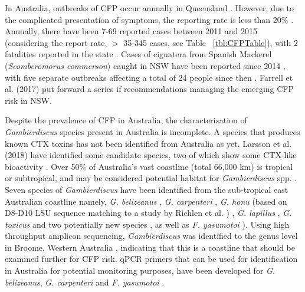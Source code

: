 \documentclass[12pt]{article}
\begin{document}
In Australia, outbreaks of CFP occur annually in Queensland \citep{qldcig}. 
However, due to the complicated presentation of symptoms, the reporting rate is less than 20\% \citep{lewis2006ciguatera}. 
Annually, there have been 7-69 reported cases between 2011 and 2015 (considering the report rate, $>$ 35-345 cases, see Table ~\ref{tbl:CFPTable}), with 2 fatalities reported in the state \citep{tonge1967ciguatera}. 
Cases of ciguatera from Spanish Mackerel (\textit{Scomberomorus commerson}) caught in NSW have been reported since 2014 \cite{farrellclinical}, with five separate outbreaks affecting a total of 24 people since then \citep{farrell2017management}. 
Farrell et al. (2017) put forward a series if recommendations managing the emerging CFP risk in NSW.

Despite the prevalence of CFP in Australia, the characterization of \textit{Gambierdiscus} species present in Australia is incomplete. 
A species that produces known CTX toxins has not been identified from Australia as yet. 
Larsson et al. (2018) have identified some candidate species, two of which show some CTX-like bioactivity \cite{larsson2018toxicology}.
Over 50\% of Australia's vast coastline (total 66,000 km) is tropical or subtropical, and may be considered potential habitat for \emph{Gambierdiscus} spp. \citep{kretzschmar2017characterization}. 
Seven species of \emph{Gambierdiscus} have been identified from the sub-tropical east Australian coastline namely, \emph{G. belizeanus} \citep{murray2014molecular}, \emph{G. carpenteri} \citep{kohli2014high,sparrow2017effects}, \emph{G. honu} (based on D8-D10 LSU sequence matching to a study by Richlen et al. \cite{richlen2008phylogeography}) \citep{rhodes2017new}, \emph{G. lapillus} \citep{kretzschmar2017characterization,larsson2018toxicology}, \emph{G. toxicus} \citep{hallegraeff2010algae} and two potentially new species \cite{larsson2018toxicology}, as well as \emph{F. yasumotoi}  \citep{murray2014molecular}). 
Using high throughput amplicon sequencing, \textit{Gambierdiscus} was identified to the genus level in Broome, Western Australia \citep{kohli2014cob}, indicating that this is a coastline that should be examined further for CFP risk. 
qPCR primers that can be used for identification in Australia for potential monitoring purposes, have been developed for \emph{G. belizeanus}, \emph{G. carpenteri} and \emph{F. yasumotoi} \citep{nishimura2016quantitative,vandersea2012development}. 
 
\end{document}
